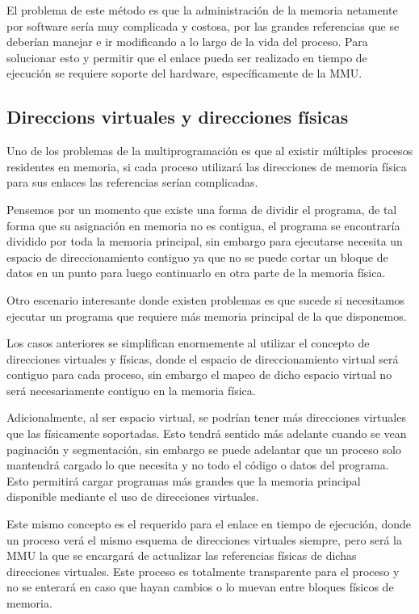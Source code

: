 El problema de este método es que la administración de la memoria netamente por
software sería muy complicada y costosa, por las grandes referencias que se
deberían manejar e ir modificando a lo largo de la vida del proceso. Para
solucionar esto y permitir que el enlace pueda ser realizado en tiempo de
ejecución se requiere soporte del hardware, específicamente de la MMU.

\subsection{Direccions virtuales y direcciones físicas}
Uno de los problemas de la multiprogramación es que al existir múltiples
procesos residentes en memoria, si cada proceso utilizará las direcciones de
memoria física para sus enlaces las referencias serían complicadas.

Pensemos por un momento que existe una forma de dividir el programa, de tal
forma que su asignación en memoria no es contigua, el programa se encontraría
dividido por toda la memoria principal, sin embargo para ejecutarse necesita un
espacio de direccionamiento contiguo ya que no se puede cortar un bloque de
datos en un punto para luego continuarlo en otra parte de la memoria física.

Otro escenario interesante donde existen problemas es que sucede si necesitamos
ejecutar un programa que requiere más memoria principal de la que disponemos.

Los casos anteriores se simplifican enormemente al utilizar el concepto de
direcciones virtuales y físicas, donde el espacio de direccionamiento virtual
será contiguo para cada proceso, sin embargo el mapeo de dicho espacio virtual
no será necesariamente contiguo en la memoria física.

Adicionalmente, al ser espacio virtual, se podrían tener más direcciones
virtuales que las físicamente soportadas. Esto tendrá sentido más adelante
cuando se vean paginación y segmentación, sin embargo se puede adelantar que un
proceso solo mantendrá cargado lo que necesita y no todo el código o datos del
programa. Esto permitirá cargar programas más grandes que la memoria principal
disponible mediante el uso de direcciones virtuales.

Este mismo concepto es el requerido para el enlace en tiempo de ejecución, donde
un proceso verá el mismo esquema de direcciones virtuales siempre, pero será la
MMU la que se encargará de actualizar las referencias físicas de dichas
direcciones virtuales. Este proceso es totalmente transparente para el proceso y
no se enterará en caso que hayan cambios o lo muevan entre bloques físicos de
memoria.

